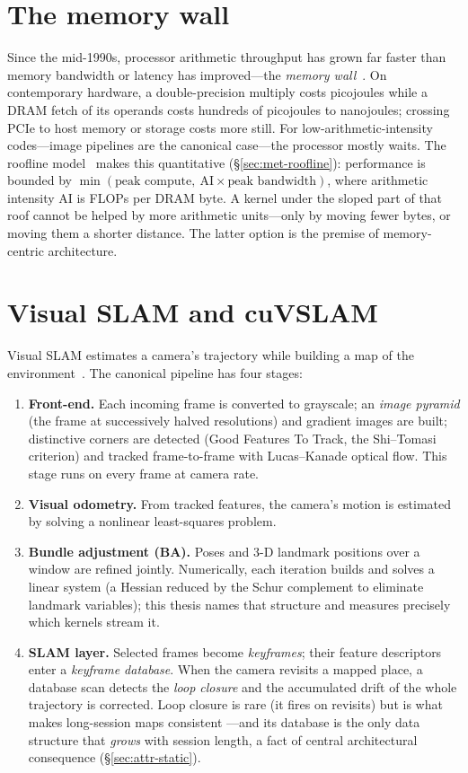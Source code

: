 \section{The memory wall}
\label{sec:bg-wall}

Since the mid-1990s, processor arithmetic throughput has grown far faster
than memory bandwidth or latency has improved---the \emph{memory
wall}~\cite{wulf1995memorywall}. On contemporary hardware, a double-precision
multiply costs picojoules while a DRAM fetch of its operands costs hundreds
of picojoules to nanojoules; crossing PCIe to host memory or storage costs
more still. For low-arithmetic-intensity codes---image pipelines are the
canonical case---the processor mostly waits. The roofline
model~\cite{williams2009roofline} makes this quantitative
(\S\ref{sec:met-roofline}): performance is bounded by
$\min(\text{peak compute},\ \text{AI}\times\text{peak bandwidth})$, where
arithmetic intensity AI is FLOPs per DRAM byte. A kernel under the sloped
part of that roof cannot be helped by more arithmetic units---only by moving
fewer bytes, or moving them a shorter distance. The latter option is the
premise of memory-centric architecture.

\section{Visual SLAM and cuVSLAM}
\label{sec:bg-slam}

Visual SLAM estimates a camera's trajectory while building a map of the
environment~\cite{cadena2016slam,durrant2006slam}. The canonical pipeline has
four stages:

\begin{enumerate}
\item \textbf{Front-end.} Each incoming frame is converted to grayscale;
an \emph{image pyramid} (the frame at successively halved resolutions) and
gradient images are built; distinctive corners are detected (Good Features
To Track, the Shi--Tomasi criterion) and tracked frame-to-frame with
Lucas--Kanade optical flow. This stage runs on every frame at camera rate.
\item \textbf{Visual odometry.} From tracked features, the camera's motion
is estimated by solving a nonlinear least-squares problem.
\item \textbf{Bundle adjustment (BA).} Poses and 3-D landmark positions over
a window are refined jointly. Numerically, each iteration builds and solves
a linear system (a Hessian reduced by the Schur complement to eliminate
landmark variables); this thesis names that structure
 and measures precisely which kernels stream it.
\item \textbf{SLAM layer.} Selected frames become \emph{keyframes}; their
feature descriptors enter a \emph{keyframe database}. When the camera
revisits a mapped place, a database scan detects the \emph{loop closure} and
the accumulated drift of the whole trajectory is corrected. Loop closure is
rare (it fires on revisits) but is what makes long-session maps consistent
---and its database is the only data structure that \emph{grows} with
session length, a fact of central architectural consequence
(\S\ref{sec:attr-static}).
\end{enumerate}

